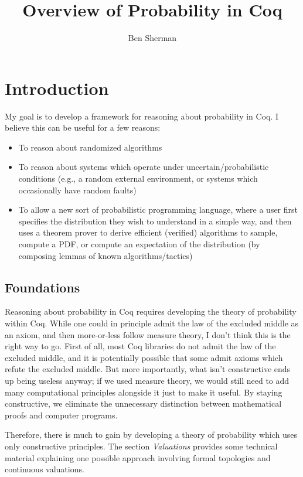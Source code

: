\documentclass{article}           %
\title{Overview of Probability in Coq}
\author{Ben Sherman}
\begin{document}
\maketitle

\section{Introduction}

My goal is to develop a framework for reasoning about probability in Coq. I believe this can be useful for a few reasons:
\begin{itemize}
\item To reason about randomized algorithms
\item To reason about systems which operate under uncertain/probabilistic conditions (e.g., a random external environment, or systems which occasionally have random faults)
\item To allow a new sort of probabilistic programming language, where a user first specifies the distribution they wish to understand in a simple way, and then uses a theorem prover to derive efficient (verified) algorithms to sample, compute a PDF, or compute an expectation of the distribution (by composing lemmas of known algorithms/tactics)
\end{itemize}

\subsection{Foundations}

Reasoning about probability in Coq requires developing the theory of probability within Coq. While one could in principle admit the law of the excluded middle as an axiom, and then more-or-less follow measure theory, I don't think this is the right way to go. First of all, most Coq libraries do not admit the law of the excluded middle, and it is potentially possible that some admit axioms which refute the excluded middle. But more importantly, what isn't constructive ends up being useless anyway; if we used measure theory, we would still need to add many computational principles alongside it just to make it useful. By staying constructive, we eliminate the unnecessary distinction between mathematical proofs and computer programs.

Therefore, there is much to gain by developing a theory of probability which uses only constructive principles. The section \emph{Valuations} provides some technical material explaining one possible approach involving formal topologies and continuous valuations.
\end{document}
